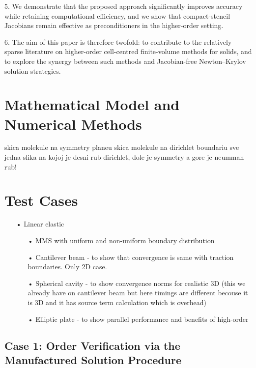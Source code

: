 \documentclass[sn-mathphys,Numbered]{sn-jnl}%
\begin{document}
	5.	We demonstrate that the proposed approach significantly improves accuracy while retaining computational efficiency, and we show that compact-stencil Jacobians remain effective as preconditioners in the higher-order setting.

	6.	The aim of this paper is therefore twofold: to contribute to the relatively sparse literature on higher-order cell-centred finite-volume methods for solids, and to explore the synergy between such methods and Jacobian-free Newton–Krylov solution strategies.

\section{Mathematical Model and Numerical Methods}\label{sec:math_model}

skica molekule na symmetry planeu
skica molekule na dirichlet boundariu
sve jedna slika na kojoj je desni rub dirichlet, dole je symmetry a gore je neumman rub!

\section{Test Cases}\label{sec:test_cases}

\begin{itemize}
\item[•] Linear elastic
\begin{itemize}
\item[•] MMS with uniform and non-uniform boundary distribution
\item[•] Cantilever beam - to show that convergence is same with traction boundaries. Only 2D case. 
\item[•] Spherical cavity - to show convergence norms for realistic 3D (this we already have on cantilever beam but here timings are different becouse it is 3D and it has source term calculation which is overhead)
\item[•] Elliptic plate - to show parallel performance and benefits of high-order
\end{itemize}
\end{itemize}
\subsection{Case 1: Order Verification via the Manufactured Solution Procedure}
\end{document}
